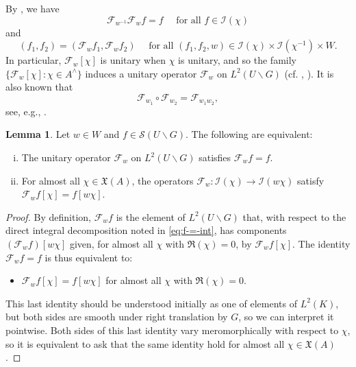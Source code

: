 \documentclass[reqno]{amsart}
\theoremstyle{plain} \newtheorem{theorem} {Theorem}
\theoremstyle{definition} \newtheorem{definition} [theorem] {Definition}
\theoremstyle{itplain} %
\newtheorem{lemma}[theorem]{Lemma}
\numberwithin{equation}{section}
\numberwithin{theorem}{section}
\begin{document}
By \cite[Prop 3.1.4]{MR610479}, we have
\begin{equation}\label{eq:mathc-1-mathc}
  \mathcal{F}_{w^{-1}} \mathcal{F}_w  f = f
  \quad \text{ for all } f \in \mathcal{I}(\chi)
\end{equation}
and
\begin{equation}\label{eq:f_1chi-f_2chi-1}
  (f_1, f_2) = 
  (\mathcal{F}_w f_1, \mathcal{F}_w f_2)
  \quad
  \text{ for all } (f_1,f_2,w) \in \mathcal{I}(\chi) \times \mathcal{I}(\chi^{-1}) \times W.
\end{equation}
In particular, $\mathcal{F}_w[\chi]$ is unitary when $\chi$ is unitary, and so the family $\{\mathcal{F}_w[\chi] : \chi \in A^\wedge \}$ induces a unitary operator $\mathcal{F}_w$ on $L^2(U \backslash G)$ (cf. \cite[\S3.5]{MR3468638}, \cite{MR1694894,MR1988971,MR3969881}).  It is also known that
\begin{equation*}
  \mathcal{F}_{w_1} \circ \mathcal{F}_{w_2} = \mathcal{F}_{w_1 w_2},
\end{equation*}
see, e.g., \cite[Thm 2.1, $(R_2)$]{MR999488}.

\begin{lemma}\label{lem:standard2:let-w-in}
  Let $w \in W$ and $f \in \mathcal{S}(U \backslash G)$.  The following are equivalent:
  \begin{enumerate}[(i)]
  \item \label{itm:standard2:F-w-unitary} The unitary operator $\mathcal{F}_w$ on $L^2(U \backslash G)$ satisfies $\mathcal{F}_w f = f$.
  \item \label{itm:standard2:F-w-mellin} For almost all $\chi \in \mathfrak{X}(A)$, the operators $\mathcal{F}_w : \mathcal{I}(\chi) \rightarrow \mathcal{I}(w \chi)$ satisfy $\mathcal{F}_w f[\chi] = f [ w \chi]$.
  \end{enumerate}
\end{lemma}
\begin{proof}
  By definition, $\mathcal{F}_w f$ is the element of $L^2(U \backslash G)$ that, with respect to the direct integral decomposition noted in \eqref{eq:f-=-int}, has components $(\mathcal{F}_w f)[w \chi]$ given, for almost all $\chi$ with $\Re(\chi) = 0$, by $\mathcal{F}_w f[\chi]$.  The identity $\mathcal{F}_w f = f$ is thus equivalent to:
  \begin{itemize}
  \item $\mathcal{F}_w f[\chi] = f[w \chi]$ for almost all $\chi$ with $\Re(\chi) = 0$.
  \end{itemize}
  This last identity should be understood initially as one of elements of $L^2(K)$, but both sides are smooth under right translation by $G$, so we can interpret it pointwise.  Both sides of this last identity vary meromorphically with respect to $\chi$, so it is equivalent to ask that the same identity hold for almost all $\chi \in \mathfrak{X}(A)$.
\end{proof}
\end{document}
